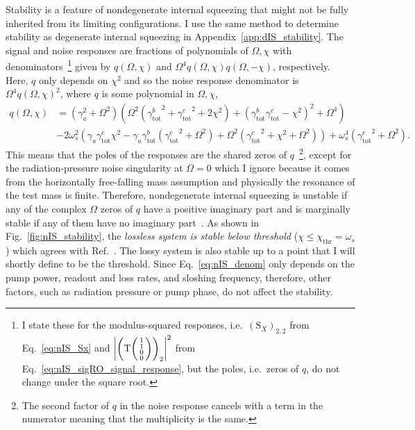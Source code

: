 Stability is a feature of nondegenerate internal squeezing that might not be fully inherited from its limiting configurations. I use the same method to determine stability as degenerate internal squeezing in Appendix~\ref{app:dIS_stability}. The signal and noise responses are fractions of polynomials of $\Omega, \chi$ with denominators~\footnote{I state these for the modulus-squared responses, i.e.\ $(\text{S}_X)_{2,2}$ from Eq.~\ref{eq:nIS_Sx} and $\abs{\left(\text{T}\begin{psmallmatrix}1 \\1\\0\\0\end{psmallmatrix}\right)_2}^2$ from Eq.~\ref{eq:nIS_sigRO_signal_response}, but the poles, i.e.\ zeros of $q$, do not change under the square root.} given by $q(\Omega,\chi)$ and $\Omega^4 q(\Omega,\chi) q(\Omega,-\chi)$, respectively. Here, $q$ only depends on $\chi^2$ and so the noise response denominator is $\Omega^4 q(\Omega,\chi)^2$, where $q$ is some polynomial in $\Omega, \chi$, 
\begin{align}\label{eq:nIS_denom}
q(\Omega,\chi)&=\left(\gamma_a^2+\Omega ^2\right) \left(\Omega ^2 \left({\gamma^b_\text{tot}}^2+{\gamma^c_\text{tot}}^2+2 \chi ^2\right)+\left({\gamma^b_\text{tot}} {\gamma^c_\text{tot}}-\chi ^2\right)^2+\Omega ^4\right)\\
&-2 \omega_s^2 \left(\gamma_a {\gamma^c_\text{tot}} \chi ^2-\gamma_a {\gamma^b_\text{tot}} \left({\gamma^c_\text{tot}}^2+\Omega ^2\right)+\Omega ^2 \left({\gamma^c_\text{tot}}^2+\chi ^2+\Omega ^2\right)\right)+\omega_s^4 \left({\gamma^c_\text{tot}}^2+\Omega ^2\right).\nonumber
\end{align}
This means that the poles of the responses are the shared zeros of $q$~\footnote{The second factor of $q$ in the noise response cancels with a term in the numerator meaning that the multiplicity is the same.}, except for the radiation-pressure noise singularity at $\Omega=0$ which I ignore because it comes from the horizontally free-falling mass assumption and physically the resonance of the test mass is finite. %
Therefore, nondegenerate internal squeezing is unstable if any of the complex $\Omega$ zeros of $q$ have a positive imaginary part and is marginally stable if any of them have no imaginary part~\cite{nise_2019}. As shown in Fig.~\ref{fig:nIS_stability}, the \emph{lossless system is stable below threshold} ($\chi\leq\chi_\text{thr}=\omega_s$) which agrees with Ref.~\cite{liBroadbandSensitivityImprovement2020}. The lossy system is also stable up to a point that I will shortly define to be the threshold. %
Since Eq.~\ref{eq:nIS_denom} only depends on the pump power, readout and loss rates, and sloshing frequency, therefore, other factors, such as radiation pressure or pump phase, do not affect the stability.


